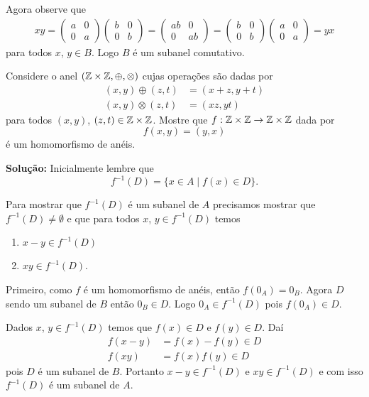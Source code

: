 \documentclass[12pt]{article}
\begin{document}
Agora observe que
\begin{align*}
	xy = \begin{pmatrix}
		a & 0\\0 & a
	\end{pmatrix}\begin{pmatrix}
		b & 0\\0 & b
	\end{pmatrix} = \begin{pmatrix}
		ab & 0\\0 & ab
	\end{pmatrix} = \begin{pmatrix}
		b & 0\\0 & b
	\end{pmatrix}\begin{pmatrix}
		a & 0\\0 & a
	\end{pmatrix} = yx
\end{align*}
para todos $x$, $y \in B$. Logo $B$ é um subanel comutativo.


\vspace{.5cm}

\questao Considere o anel $(\mathbb{Z} \times \mathbb{Z}, \oplus, \otimes)$ cujas operações são dadas por
\begin{align*}
	(x, y) \oplus (z, t) &= (x + z, y + t)\\
	(x, y) \otimes (z, t) &= (xz, yt)
\end{align*}
para todos $(x, y)$, $(z, t) \in \mathbb{Z} \times \mathbb{Z}$. Mostre que $f : \mathbb{Z} \times \mathbb{Z} \to \mathbb{Z} \times \mathbb{Z}$ dada por
\[
	f(x, y) = (y, x)
\]
é um homomorfismo de anéis.

\noindent\textbf{Solu\c{c}\~ao:} Inicialmente lembre que
\[
	f^{-1}(D) = \{x \in A \mid f(x) \in D\}.
\]

Para mostrar que $f^{-1}(D)$ é um subanel de $A$ precisamos mostrar que $f^{-1}(D) \ne \emptyset$ e que para todos $x$, $y \in f^{-1}(D)$ temos
\begin{enumerate}[label=({\alph*})]
	\item $x - y \in f^{-1}(D)$
	\item $xy \in f^{-1}(D)$.
\end{enumerate}

Primeiro, como $f$ é um homomorfismo de anéis, então $f(0_A) = 0_B$. Agora $D$ sendo um subanel de $B$ então $0_B \in D$. Logo $0_A \in f^{-1}(D)$ pois $f(0_A) \in D$.

Dados $x$, $y \in f^{-1}(D)$ temos que $f(x) \in D$ e $f(y) \in D$. Daí
\begin{align*}
	f(x - y) &= f(x) - f(y) \in D\\
	f(xy) &= f(x)f(y) \in D
\end{align*}
pois $D$ é um subanel de $B$. Portanto $x - y \in f^{-1}(D)$ e $xy \in f^{-1}(D)$ e com isso $f^{-1}(D)$ é um subanel de $A$.
\end{document}
